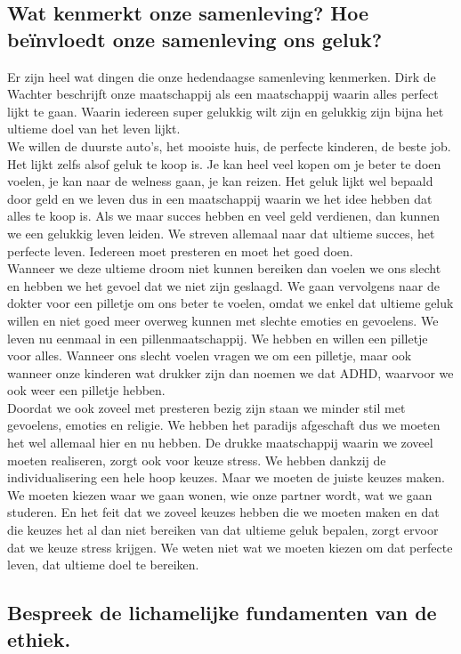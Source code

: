 \documentclass[11pt,a4paper,titlepage]{article}
\begin{document}
\subsection{Wat kenmerkt onze samenleving? Hoe beïnvloedt onze samenleving ons geluk?}
Er zijn heel wat dingen die onze hedendaagse samenleving kenmerken. Dirk de Wachter beschrijft onze maatschappij als een maatschappij waarin alles perfect lijkt te gaan. Waarin iedereen super gelukkig wilt zijn en gelukkig zijn bijna het ultieme doel van het leven lijkt. \\ We willen de duurste auto's, het mooiste huis, de perfecte kinderen, de beste job. Het lijkt zelfs alsof geluk te koop is. Je kan heel veel kopen om je beter te doen voelen, je kan naar de welness gaan, je kan reizen. Het geluk lijkt wel bepaald door geld en we leven dus in een maatschappij waarin we het idee hebben dat alles te koop is. Als we maar succes hebben en veel geld verdienen, dan kunnen we een gelukkig leven leiden. We streven allemaal naar dat ultieme succes, het perfecte leven. Iedereen moet presteren en moet het goed doen. \\
Wanneer we deze ultieme droom niet kunnen bereiken dan voelen we ons slecht en hebben we het gevoel dat we niet zijn geslaagd. We gaan vervolgens naar de dokter voor een pilletje om ons beter te voelen, omdat we enkel dat ultieme geluk willen en niet goed meer overweg kunnen met slechte emoties en gevoelens. We leven nu eenmaal in een pillenmaatschappij. We hebben en willen een pilletje voor alles. Wanneer ons slecht voelen vragen we om een pilletje, maar ook wanneer onze kinderen wat drukker zijn dan noemen we dat ADHD, waarvoor we ook weer een pilletje hebben.  \\
Doordat we ook zoveel met presteren bezig zijn staan we minder stil met gevoelens, emoties en religie. We hebben het paradijs afgeschaft dus we moeten het wel allemaal hier en nu hebben. De drukke maatschappij waarin we zoveel moeten realiseren, zorgt ook voor keuze stress. We hebben dankzij de individualisering een hele hoop keuzes. Maar we moeten de juiste keuzes maken. We moeten kiezen waar we gaan wonen, wie onze partner wordt, wat we gaan studeren. En het feit dat we zoveel keuzes hebben die we moeten maken en dat die keuzes het al dan niet bereiken van dat ultieme geluk bepalen, zorgt ervoor dat we keuze stress krijgen. We weten niet wat we moeten kiezen om dat perfecte leven, dat ultieme doel te bereiken.

\subsection{Bespreek de lichamelijke fundamenten van de ethiek.}
\end{document}
